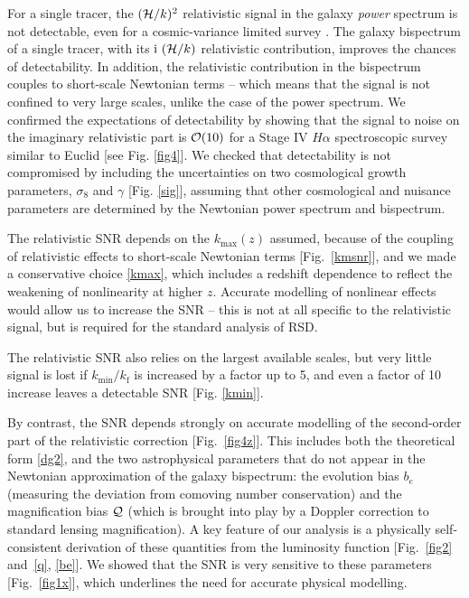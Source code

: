 For a single tracer, the $(\mathcal{H}/k)^{2}$ relativistic signal in the galaxy {\em power} spectrum is not detectable, even for a cosmic-variance limited survey \cite{Alonso:2015uua}.
The galaxy bispectrum of a single tracer, with its ${\mathrm{i\,}}\,(\mathcal{H}/k)$ relativistic contribution, improves the chances of detectability. In addition, the relativistic contribution in the bispectrum couples to short-scale Newtonian terms -- which means that the signal is not confined to very large scales, unlike the case of the power spectrum. We confirmed the expectations of detectability by showing that the signal to noise on the imaginary relativistic part is ${\cal O}(10)$ for a Stage IV $H\alpha$ spectroscopic survey similar to Euclid [see Fig. \ref{fig4}].  We checked that detectability is not compromised by including the uncertainties on two cosmological growth parameters, $\sigma_8$ and $\gamma$ [Fig. \ref{sig}], assuming that other cosmological  and nuisance parameters are determined by the Newtonian power spectrum and bispectrum. 


The relativistic SNR depends on the $k_{\mathrm{max}}(z)$ assumed, because of the coupling of relativistic effects to short-scale Newtonian terms [Fig.~\ref{kmsnr}], and  we made a conservative choice \eqref{kmax}, which includes a redshift dependence to reflect the weakening of nonlinearity at higher $z$. 
Accurate modelling of nonlinear effects would allow us to increase the SNR  
 -- this is not at all specific to the relativistic signal,  but is required for the standard analysis of RSD.

The relativistic SNR also relies  on the largest available scales, but very little signal is lost if $k_{\mathrm{min}}/k_{\mathrm{f}}$ is increased by a factor up  to 5, and even a factor of 10 increase leaves a detectable SNR  [Fig. \ref{kmin}].

By contrast, the SNR depends strongly on accurate modelling of the second-order part of the relativistic correction  [Fig.~\ref{fig4z}]. This includes both the theoretical form \eqref{dg2}, and the
 two astrophysical parameters that do not appear in the Newtonian approximation of the galaxy bispectrum: the evolution bias $b_e$ (measuring the deviation from comoving number conservation) and the magnification bias $\mathcal{Q}$ (which is brought into play by a Doppler correction to standard lensing magnification).  A key feature of our analysis is a physically self-consistent derivation of these quantities from the luminosity function [Fig.~\ref{fig2} and~\eqref{q}, \eqref{be}].
We showed that the SNR is very sensitive to these parameters [Fig.~\ref{fig1x}], which underlines the need for accurate physical modelling. 

